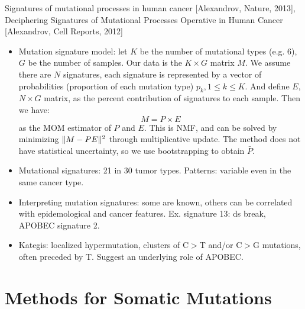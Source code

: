 \documentclass{report}
\begin{document}
Signatures of mutational processes in human cancer [Alexandrov, Nature, 2013], Deciphering Signatures of Mutational Processes Operative in Human Cancer [Alexandrov, Cell Reports, 2012]
\begin{itemize}
	\item Mutation signature model: let $K$ be the number of mutational types (e.g. 6), $G$ be the number of samples. Our data is the $K \times G$ matrix $M$. We assume there are $N$ signatures, each signature is represented by a vector of probabilities (proportion of each mutation type) $p_k, 1\leq k \leq K$. And define $E$, $N \times G$ matrix, as the percent contribution of signatures to each sample. Then we have:
	\begin{equation}
	M = P \times E
	\end{equation}
	as the MOM estimator of $P$ and $E$. This is NMF, and can be solved by minimizing $\lVert M - PE\rVert^2$ through multiplicative update. The method does not have statistical uncertainty, so we use bootstrapping to obtain $\bar{P}$. 
	
	\item Mutational signatures: 21 in 30 tumor types. Patterns: variable even in the same cancer type. 
	
	\item Interpreting mutation signatures: some are known, others can be correlated with epidemological and cancer features. Ex. signature 13: ds break, APOBEC signature 2.
	
	\item Kategis: localized hypermutation, clusters of C$>$T and/or C$>$G mutations, often preceded by T. Suggest an underlying role of APOBEC.  
\end{itemize}

\section{Methods for Somatic Mutations}
\end{document}
